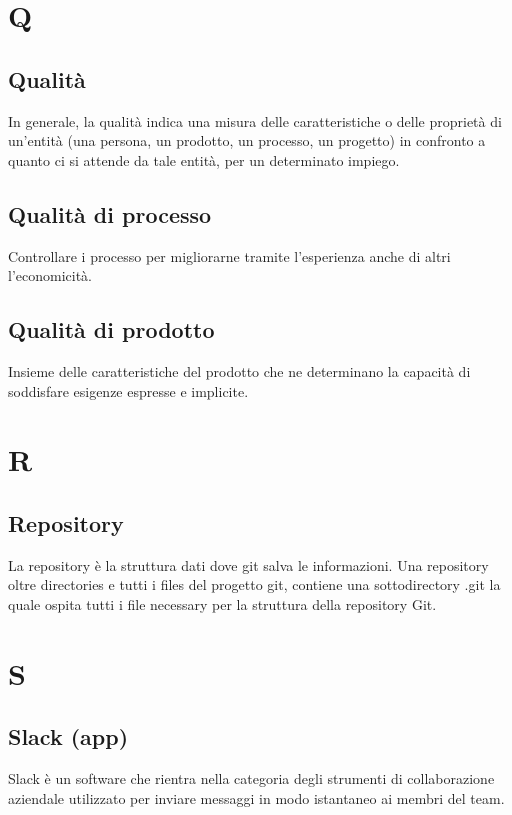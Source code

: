 	\section{Q}
	\subsection{Qualità} 
	In generale, la qualità indica una misura delle caratteristiche o delle proprietà di un'entità (una persona, un prodotto, un processo, un progetto) in confronto a quanto ci si attende da tale entità, per un determinato impiego.
	
	\subsection{Qualità di processo}
	Controllare i processo per migliorarne tramite l'esperienza anche di altri l'economicità.
	
	\subsection{Qualità di prodotto}
	Insieme delle caratteristiche del prodotto che ne determinano la capacità di soddisfare esigenze espresse e implicite.
	
	
	\section{R}
	\subsection{Repository} 
	La repository è la struttura dati dove git salva le informazioni. Una repository oltre directories e tutti i files del progetto git, contiene una sottodirectory .git la quale ospita tutti i file necessary per la struttura della repository Git.

	\section{S}
	\subsection{Slack (app)} 
	Slack è un software che rientra nella categoria degli strumenti di collaborazione aziendale utilizzato per inviare messaggi in modo istantaneo ai membri del team.
	
